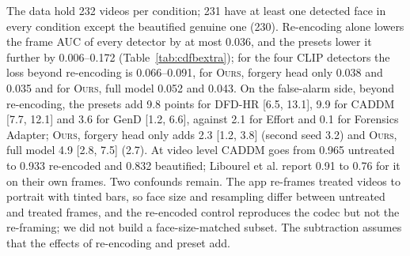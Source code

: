 \documentclass[10pt]{article}
\newcommand{\oursB}{\textsc{Ours}, forgery head only}
\newcommand{\oursF}{\textsc{Ours}, full model}
\begin{document}
The data hold 232 videos per condition; 231 have at least one detected face in every condition except the beautified genuine one
(230). Re-encoding alone lowers the frame AUC of every detector by at most 0.036, and the presets lower it further by 0.006--0.172
(Table~\ref{tab:cdfbextra}); for the four CLIP detectors the loss beyond re-encoding is 0.066--0.091, for \oursB{} 0.038 and
0.035 and for \oursF{} 0.052 and 0.043.
On the false-alarm side, beyond re-encoding, the presets add 9.8 points for DFD-HR [6.5, 13.1], 9.9 for CADDM [7.7, 12.1] and 3.6 for
GenD [1.2, 6.6], against 2.1 for Effort and 0.1 for Forensics Adapter; \oursB{} adds 2.3 [1.2, 3.8] (second seed 3.2) and
\oursF{} 4.9 [2.8, 7.5] (2.7). At video
level CADDM goes from 0.965 untreated to 0.933 re-encoded and 0.832 beautified; Libourel et al. report 0.91 to 0.76 for it on
their own frames. Two confounds remain. The app re-frames treated videos to portrait with tinted bars, so face size and
resampling differ between untreated and treated frames, and the re-encoded control reproduces the codec but not the re-framing;
we did not build a face-size-matched subset. The subtraction assumes that the effects of re-encoding and preset add.

\begin{table}[H]
\centering
\caption{The same videos, frames and per-video filter assignment with the filter applied to the face crop or to the full frame
before the crop (frame AUC). A filter with a vignette is centred on the face in the first case. The paper reports the full-frame
version.}
\label{tab:fullframe}
\footnotesize
\begin{adjustbox}{max width=\linewidth}\end{adjustbox}
\end{table}
\end{document}
